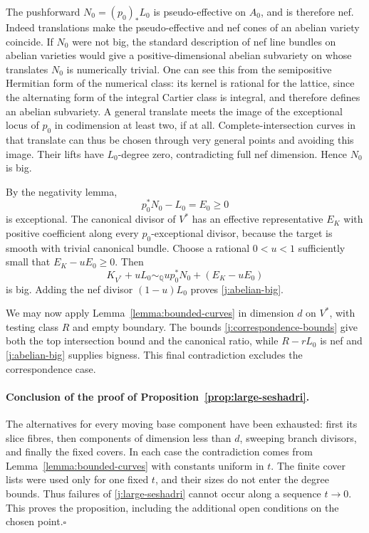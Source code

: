 \documentclass[12pt,a4paper,psamsfonts]{amsart}
\theoremstyle{definition}
\theoremstyle{plain}
\newcommand{\Q}{\mathbb Q}
\begin{document}
The pushforward $N_0=(p_0)_*L_0$ is pseudo-effective on $A_0$,
and is therefore nef. Indeed translations make the
pseudo-effective and nef cones of an abelian variety coincide.
If $N_0$ were not big, the standard description of nef line
bundles on abelian varieties would give a positive-dimensional
abelian subvariety on whose translates $N_0$ is numerically
trivial. One can see this from the semipositive Hermitian form of
the numerical class: its kernel is rational for the lattice,
since the alternating form of the integral Cartier class is
integral, and therefore defines an abelian subvariety.
A general translate meets the image of the exceptional locus of
$p_0$ in codimension at least two, if at all. Complete-intersection
curves in that translate can thus be chosen through very general
points and avoiding this image. Their lifts have $L_0$-degree
zero, contradicting full nef dimension. Hence $N_0$ is big.

By the negativity lemma,
\[
                         p_0^*N_0-L_0=E_0\ge0
\]
is exceptional. The canonical divisor of $V^*$ has an effective
representative $E_K$ with positive coefficient along every
$p_0$-exceptional divisor, because the target is smooth with
trivial canonical bundle. Choose a rational $0<u<1$ sufficiently
small that $E_K-uE_0\ge0$. Then
\[
 K_{V^*}+uL_0\sim_\Q u p_0^*N_0+(E_K-uE_0)
\]
is big. Adding the nef divisor $(1-u)L_0$ proves
\eqref{j:abelian-big}.

We may now apply Lemma~\ref{lemma:bounded-curves} in dimension
$d$ on $V^*$, with testing class $R$ and empty boundary.
The bounds \eqref{j:correspondence-bounds} give both the top
intersection bound and the canonical ratio, while $R-rL_0$ is
nef and \eqref{j:abelian-big} supplies bigness. This final
contradiction excludes the correspondence case.

\paragraph{Conclusion of the proof of
Proposition~\ref{prop:large-seshadri}.}
The alternatives for every moving base component have been
exhausted: first its slice fibres, then components of dimension
less than $d$, sweeping branch divisors, and finally the fixed
covers. In each case the contradiction comes from
Lemma~\ref{lemma:bounded-curves} with constants uniform in $t$.
The finite cover lists were used only for one fixed $t$, and their
sizes do not enter the degree bounds. Thus failures of
\eqref{j:large-seshadri} cannot occur along a sequence $t\to0$.
This proves the proposition, including the additional open
conditions on the chosen point.\hfill$\square$
\end{document}
